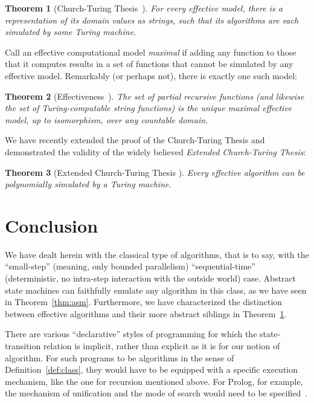 \documentclass[copyright,creativecommons,english]{eptcs}
\newtheorem{theorem}{Theorem}
\begin{document}
\begin{theorem}[{Church-Turing Thesis~\cite{CTT}}]\label{thm:ctt}
For every effective model, there is a representation of its domain values
as strings, such that its algorithms are each simulated by some Turing machine.
\end{theorem}

Call an effective computational model 
\emph{maximal} if adding any function to those that it computes results in a
set of functions that cannot be simulated by any effective model. 
Remarkably (or perhaps not), there is exactly one such model:

\begin{theorem}[{Effectiveness~\cite[Theorem 4]{Three}}]
The set of partial recursive functions (and likewise the set of Turing-computable string functions) is the unique maximal effective model, up to isomorphism, over any countable domain.
\end{theorem}

We have recently extended the proof of the Church-Turing Thesis and
demonstrated the validity of the widely believed \textit{Extended Church-Turing Thesis}: 

\begin{theorem}[Extended Church-Turing Thesis \cite{ECCT}]\label{thm:ectt}
Every effective
algorithm can be polynomially simulated by a Turing machine. 
\end{theorem}

\section{Conclusion}\label{sec:end}

We have dealt herein with the classical type of algorithms, that is to say, with the ``small-step'' (meaning, only bounded parallelism) ``sequential-time'' (deterministic, no intra-step interaction with the
outside world) case.
Abstract state machines can faithfully emulate any algorithm in this class, as we have seen in Theorem~\ref{thm:asm}.
Furthermore, we have characterized the distinction between effective algorithms and their more abstract siblings in Theorem~\ref{thm:ctt}.

There are various ``declarative'' styles of programming for which the state-transition relation is implicit, rather than explicit as it is for our notion of algorithm.
For such programs to be algorithms in the sense of Definition~\ref{def:class}, they would have to be equipped with a specific execution mechanism, like the one for recursion mentioned above.
For Prolog, for example, the mechanism of unification and the mode of search would need to be specified~\cite{Prolog}.
\end{document}
